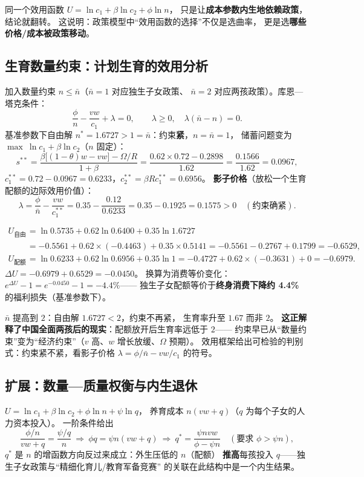 同一个效用函数 $U=\ln c_1+\beta\ln c_2+\phi\ln n$，
只是让\textbf{成本参数内生地依赖政策}，结论就翻转。
这说明：政策模型中“效用函数的选择”不仅是选曲率，
更是选\textbf{哪些价格/成本被政策移动}。

\subsection{生育数量约束：计划生育的效用分析}\label{subsec:quota}

加入数量约束 $n\le\bar n$（$\bar n=1$ 对应独生子女政策、
$\bar n=2$ 对应两孩政策）。库恩—塔克条件：
\[
\frac{\phi}{n}-\frac{vw}{c_1}+\lambda=0,\qquad
\lambda\ge0,\quad \lambda(\bar n-n)=0.
\]
基准参数下自由解 $n^*=1.6727>1=\bar n$：约束\textbf{紧}，$n=\bar n=1$，
储蓄问题变为 $\max\ \ln c_1+\beta\ln c_2$（$n$ 固定）：
\[
s^{**}=\frac{\beta\bigl[(1-\theta)w-vw\bigr]-\Omega/R}{1+\beta}
=\frac{0.62\times0.72-0.2898}{1.62}=\frac{0.1566}{1.62}=0.0967,
\]
$c_1^{**}=0.72-0.0967=0.6233$，$c_2^{**}=\beta Rc_1^{**}=0.6956$。
\textbf{影子价格}（放松一个生育配额的边际效用价值）：
\[
\lambda=\frac{\phi}{\bar n}-\frac{vw}{c_1^{**}}
=0.35-\frac{0.12}{0.6233}=0.35-0.1925=0.1575>0\quad(\text{约束确紧}).
\]

\[
\begin{aligned}
U_{\text{自由}}&=\ln 0.5735+0.62\ln 0.6400+0.35\ln 1.6727\\
&=-0.5561+0.62\times(-0.4463)+0.35\times0.5141
=-0.5561-0.2767+0.1799=-0.6529,\\
U_{\text{配额}}&=\ln 0.6233+0.62\ln 0.6956+0.35\ln 1
=-0.4727+0.62\times(-0.3631)+0=-0.6979.
\end{aligned}
\]
$\Delta U=-0.6979+0.6529=-0.0450$。
换算为消费等价变化：$e^{\Delta U}-1=e^{-0.0450}-1=-4.4\%$——
独生子女配额等价于\textbf{终身消费下降约 4.4\%} 的福利损失（基准参数下）。

$\bar n$ 提高到 $2$：自由解 $1.6727<2$，约束不再紧，
生育率升至 $1.67$ 而非 $2$。
\textbf{这正解释了中国全面两孩后的现实}：配额放开后生育率远低于 $2$——
约束早已从“数量约束”变为“经济约束”（$v$ 高、$w$ 增长放缓、$\Omega$ 预期）。
效用框架给出可检验的判别式：约束紧不紧，看影子价格
$\lambda=\phi/\bar n-vw/c_1$ 的符号。

\subsection{扩展：数量—质量权衡与内生退休}

$U=\ln c_1+\beta\ln c_2+\phi\ln n+\psi\ln q$，
养育成本 $n(vw+q)$（$q$ 为每个子女的人力资本投入）。
一阶条件给出
\[
\frac{\phi/n}{vw+q}=\frac{\psi/q}{n}
\ \Longrightarrow\
\phi q=\psi n(vw+q)
\ \Longrightarrow\
q^*=\frac{\psi nvw}{\phi-\psi n}\quad(\text{要求 }\phi>\psi n),
\]
$q^*$ 是 $n$ 的增函数方向反过来成立：外生压低的 $n$（配额）
\textbf{推高}每孩投入 $q$——独生子女政策与“精细化育儿/教育军备竞赛”
的关联在此结构中是一个内生结果。

